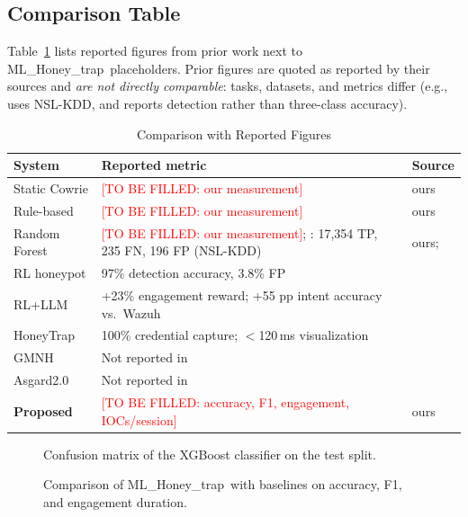 \documentclass[conference]{IEEEtran}
\newcommand{\tbf}[1]{\textcolor{red}{[TO BE FILLED: #1]}}
\newcommand{\sys}{ML\_Honey\_trap}
\begin{document}
\subsection{Comparison Table}
Table~\ref{tab:cmp} lists reported figures from prior work next to \sys\ placeholders. Prior figures are quoted as reported by their sources and \emph{are not directly comparable}: tasks, datasets, and metrics differ (e.g., \cite{ref4} uses NSL-KDD, and \cite{ref3} reports detection rather than three-class accuracy).

\begin{table}[t]
\centering
\caption{Comparison with Reported Figures}
\label{tab:cmp}
\footnotesize
\begin{tabular}{@{}p{1.4cm}p{4.7cm}p{1.1cm}@{}}
\toprule
System & Reported metric & Source \\
\midrule
Static Cowrie & \tbf{our measurement} & ours \\
Rule-based & \tbf{our measurement} & ours \\
Random Forest & \tbf{our measurement}; \cite{ref4}: 17,354 TP, 235 FN, 196 FP (NSL-KDD) & ours; \cite{ref4} \\
RL honeypot & 97\% detection accuracy, 3.8\% FP & \cite{ref3} \\
RL+LLM & +23\% engagement reward; +55 pp intent accuracy vs.\ Wazuh & \cite{ref9} \\
HoneyTrap & 100\% credential capture; $<$120\,ms visualization & \cite{ref6} \\
GMNH & Not reported in \cite{ref2} & \cite{ref2} \\
Asgard2.0 & Not reported in \cite{ref7} & \cite{ref7} \\
\textbf{Proposed} & \tbf{accuracy, F1, engagement, IOCs/session} & ours \\
\bottomrule
\end{tabular}
\end{table}

\begin{figure}[t]
\centering
\fbox{\parbox{0.9\columnwidth}{\centering\vspace{1.2cm}\tbf{confusion matrix; generate after experiments}\vspace{1.2cm}}}
\caption{Confusion matrix of the XGBoost classifier on the test split.}
\label{fig:cm}
\end{figure}

\begin{figure}[t]
\centering
\fbox{\parbox{0.9\columnwidth}{\centering\vspace{1.2cm}\tbf{baseline comparison chart; generate after experiments}\vspace{1.2cm}}}
\caption{Comparison of \sys\ with baselines on accuracy, F1, and engagement duration.}
\label{fig:cmp}
\end{figure}
\end{document}
